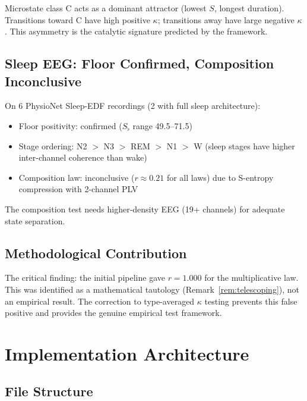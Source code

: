 \documentclass[11pt,a4paper]{article}
\theoremstyle{definition}
\theoremstyle{remark}
\newcommand{\Sfloor}{S_{\flat}}
\begin{document}
Microstate class C acts as a dominant attractor (lowest $S$, longest duration). Transitions toward C have high positive $\kappa$; transitions away have large negative $\kappa$. This asymmetry is the catalytic signature predicted by the framework.

\subsection{Sleep EEG: Floor Confirmed, Composition Inconclusive}

On 6 PhysioNet Sleep-EDF recordings (2 with full sleep architecture):
\begin{itemize}[nosep]
\item Floor positivity: confirmed ($\Sfloor$ range 49.5--71.5)
\item Stage ordering: N2 $>$ N3 $>$ REM $>$ N1 $>$ W (sleep stages have higher inter-channel coherence than wake)
\item Composition law: inconclusive ($r \approx 0.21$ for all laws) due to S-entropy compression with 2-channel PLV
\end{itemize}

The composition test needs higher-density EEG (19+ channels) for adequate state separation.

\subsection{Methodological Contribution}

The critical finding: the initial pipeline gave $r = 1.000$ for the multiplicative law. This was identified as a mathematical tautology (Remark~\ref{rem:telescoping}), not an empirical result. The correction to type-averaged $\kappa$ testing prevents this false positive and provides the genuine empirical test framework.

\section{Implementation Architecture}
\label{sec:implementation}

\subsection{File Structure}
\end{document}
